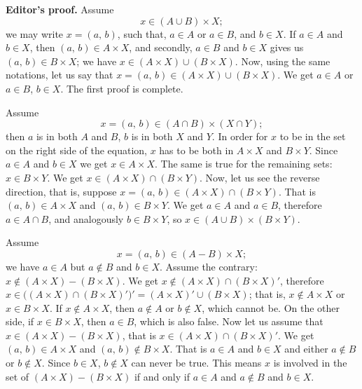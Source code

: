 \textbf{Editor's proof.} Assume
\[
	x \in (A \cup B) \times X;
\]
we may write $x = (a, \, b)$, such that, $a \in A$ or $a \in B$, and $b \in X$. If $a \in A$ and $b \in X$, then $(a, \, b) \in A \times X$, and secondly, $a \in B$ and $b \in X$ gives us $(a, \, b) \in B \times X$; we have $x \in (A \times X) \cup (B \times X)$. Now, using the same notations, let us say that $x = (a, \, b) \in (A \times X) \cup (B \times X)$. We get $a \in A$ or $a \in B$, $b \in X$. The first proof is complete.

Assume 
\[
	x = (a, \, b) \in (A \cap B) \times (X \cap Y);
\]
then $a$ is in both $A$ and $B$, $b$ is in both $X$ and $Y$. In order for $x$ to be in the set on the right side of the equation, $x$ has to be both in $A \times X$ and $B \times Y$. Since $a \in A$ and $b \in X$ we get $x \in A \times X$. The same is true for the remaining sets: $x \in B \times Y$. We get $x \in (A \times X) \cap (B \times Y)$. Now, let us see the reverse direction, that is, suppose $x = (a, \, b) \in (A \times X) \cap (B \times Y)$. That is $(a, \, b) \in A \times X$ and $(a, \, b) \in B \times Y$. We get $a \in A$ and $a \in B$, therefore $a \in A \cap B$, and analogously $b \in B \times Y$, so $x \in (A \cup B) \times (B \times Y)$.

Assume
\[
	x = (a, \, b) \in (A - B) \times X;
\]
we have $a \in A$ but $a \not \in B$ and $b \in X$. Assume the contrary: $x \not \in (A \times X) - (B \times X)$. We get $x \not \in (A \times X) \cap (B \times X)'$, therefore $x \in \big( (A \times X) \cap (B \times X)' \big)' = (A \times X)' \cup (B \times X)$; that is, $x \not \in A \times X$ or $x \in B \times X$. If $x \not \in A \times X$, then $a \not \in A$ or $b \not \in X$, which cannot be. On the other side, if $x \in B \times X$, then $a \in B$, which is also false. Now let us assume that $x \in (A \times X) - (B \times X)$, that is $x \in (A \times X) \cap (B \times X)'$. We get $(a, \, b) \in A \times X$ and $(a, \, b) \not \in B \times X$. That is $a \in A$ and $b \in X$ and either $a \not \in B$ or $b \not \in X$. Since $b \in X$, $b \not \in X$ can never be true. This means $x$ is involved in the set of $(A \times X) - (B \times X)$ if and only if $a \in A$ and $a \not \in B$ and $b \in X$.

